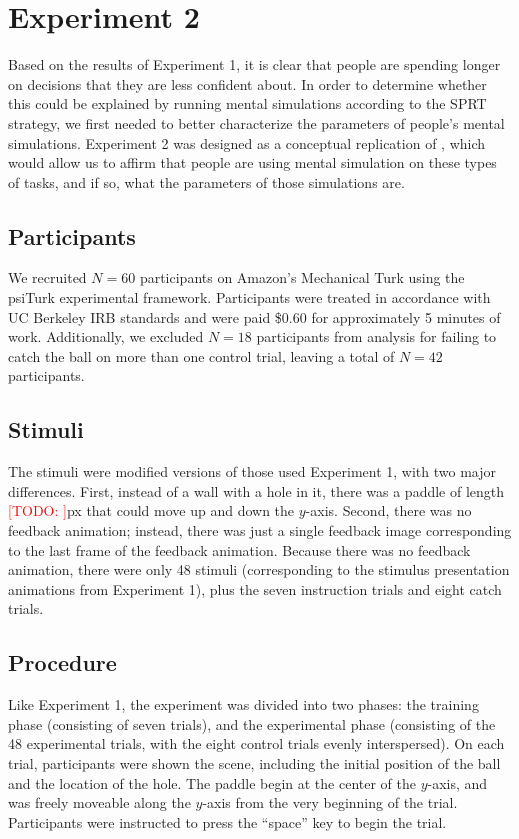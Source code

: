 \documentclass[10pt,letterpaper]{article}
\newcommand{\TODO}[1]{\textcolor{red}{[TODO: #1]}}
\begin{document}
\section{Experiment 2}

Based on the results of Experiment 1, it is clear that people are spending longer on decisions that they are less confident about. In order to determine whether this could be explained by running mental simulations according to the SPRT strategy, we first needed to better characterize the parameters of people's mental simulations. Experiment 2 was designed as a conceptual replication of , which would allow us to affirm that people are using mental simulation on these types of tasks, and if so, what the parameters of those simulations are.

\subsection{Participants}

We recruited $N=60$ participants on Amazon's Mechanical Turk using the psiTurk \cite{McDonnell12} experimental framework. Participants were treated in accordance with UC Berkeley IRB standards and were paid \$0.60 for approximately 5 minutes of work. Additionally, we excluded $N=18$ participants from analysis for failing to catch the ball on more than one control trial, leaving a total of $N=42$ participants.

\subsection{Stimuli}

The stimuli were modified versions of those used Experiment 1, with two major differences. First, instead of a wall with a hole in it, there was a paddle of length \TODO{}px that could move up and down the $y$-axis. Second, there was no feedback animation; instead, there was just a single feedback image corresponding to the last frame of the feedback animation. Because there was no feedback animation, there were only 48 stimuli (corresponding to the stimulus presentation animations from Experiment 1), plus the seven instruction trials and eight catch trials.

\subsection{Procedure}

Like Experiment 1, the experiment was divided into two phases: the training phase (consisting of seven trials), and the experimental phase (consisting of the 48 experimental trials, with the eight control trials evenly interspersed). On each trial, participants were shown the scene, including the initial position of the ball and the location of the hole. The paddle begin at the center of the $y$-axis, and was freely moveable along the $y$-axis from the very beginning of the trial. Participants were instructed to press the ``space'' key to begin the trial. 
\end{document}
